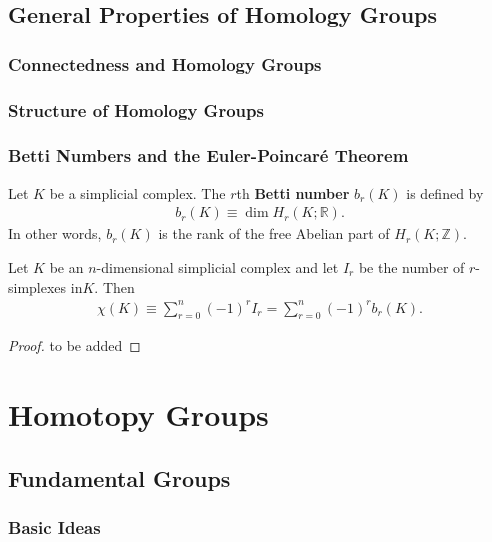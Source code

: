 \documentclass[10pt]{article}
\begin{document}
\subsection{General Properties of Homology Groups}
\subsubsection{Connectedness and Homology Groups}

\subsubsection{Structure of Homology Groups}

\subsubsection{Betti Numbers and the Euler-Poincar\'e Theorem}
\begin{definition}
    Let $K$ be a simplicial complex.
    The $r$th \textbf{Betti number} $b_r(K)$ is defined by
    \begin{align}
        b_r(K)\equiv\dim H_r(K;\mathbb{R}).
    \end{align}
    In other words, $b_r(K)$ is the rank of the free Abelian part of $H_r (K; \mathbb{Z})$.
\end{definition}

\begin{theorem}
    Let $K$ be an $n$-dimensional simplicial complex and let $I_r$ be the number of $r$-simplexes in$K$.
    Then
    \begin{align}
        \chi(K)\equiv\sum_{r=0}^{n}(-1)^r I_r=\sum_{r=0}^n(-1)^r b_r(K).
    \end{align}
\end{theorem}
\begin{proof}
    to be added
\end{proof}


\clearpage
\section{Homotopy Groups}
\subsection{Fundamental Groups}
\subsubsection{Basic Ideas}
\end{document}
